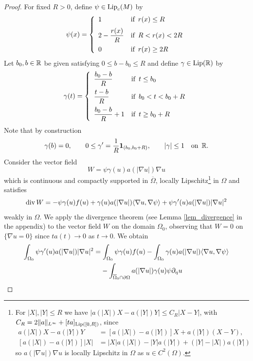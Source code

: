\documentclass[10 pt,a4paper]{article}
\theoremstyle{definition}
\begin{document}
\begin{proof}
	For fixed $R>0$, define $\psi\in\mathrm{Lip}_c(M)$ by
	\[
	\psi(x) = \left\{
	\begin{array}{l@{\quad}l}
		1 & \text{if } \, r(x) \leq R \\[0.2cm]
		2 - \dfrac{r(x)}{R} & \text{if } \, R < r(x) < 2R \\[0.3cm]
		0 & \text{if } \, r(x) \geq 2R
	\end{array}
	\right.
	\]
	Let $b_0,b\in\mathbb R$ be given satisfying $0 \leq b - b_0 \leq R$ and define $\gamma\in\mathrm{Lip}(\mathbb R)$ by
	\[
		\gamma(t) = \left\{
			\begin{array}{l@{\quad}l}
				\dfrac{b_0-b}{R} & \text{if } \, t \leq b_0 \\[0.3cm]
				\dfrac{t-b}{R} & \text{if } \, b_0 < t < b_0 + R \\[0.3cm]
				\dfrac{b_0-b}{R}+1 & \text{if } \, t \geq b_0 + R
			\end{array}
		\right.
	\]
	Note that by construction
	\[
		\gamma(b) = 0, \qquad 0\leq\gamma' = \frac{1}{R}\mathbf{1}_{(b_0,b_0+R)}, \qquad |\gamma| \leq 1 \quad \text{on } \, \mathbb R .
	\]
	Consider the vector field
	\[
		W = \psi\gamma(u)a(|\nabla u|)\nabla u
	\]
	which is continuous and compactly supported in $\overline{\Omega}$, locally Lipschitz\footnote{For $|X|,|Y|\leq R$ we have $|a(|X|)X-a(|Y|)Y| \leq C_R|X-Y|$, with $C_R = 2\|a\|_{L^\infty} + [ta]_{\mathrm{Lip}([0,R])}$, since
			\begin{align*}
			a(|X|)X - a(|Y|)Y & = [a(|X|) - a(|Y|)]X + a(|Y|)(X-Y), \\
			[a(|X|) - a(|Y|)]|X| & = |X|a(|X|) - |Y|a(|Y|) + (|Y|-|X|)a(|Y|)
			\end{align*}
	so $a(|\nabla u|)\nabla u$ is locally Lipschitz in $\Omega$ as $u \in C^2(\Omega)$.} in $\Omega$ and satisfies
	\[
		\mathrm{div} \, W = - \psi\gamma(u)f(u) + \gamma(u) a(|\nabla u|) \langle\nabla u,\nabla\psi\rangle + \psi \gamma'(u) a(|\nabla u|) |\nabla u|^2
	\]
	weakly in $\Omega$. We apply the divergence theorem (see Lemma \ref{lem_divergence} in the appendix) to the vector field $W$ on the domain $\Omega_0$, observing that $W = 0$ on $\{\nabla u = 0\}$ since $ta(t) \to 0$ as $t\to0$. We obtain
	\begin{align*}
		\int_{\Omega_0} \psi \gamma'(u) \aaa |\nabla u|^2 & =  
		\int_{\Omega_0} \psi \gamma(u)f(u) - \int_{\Omega_0} \gamma(u) \aaa \langle \nabla u, \nabla \psi \rangle \\
		& \phantom{=\;} - \int_{\overline{\Omega}_0\cap\partial \Omega} a(|\nabla u|) \gamma(u)\psi \partial_\eta u 

\end{align*}
\end{proof}
\end{document}
